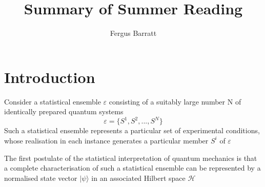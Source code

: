 \documentclass[reqno]{amsart}
\title{Summary of Summer Reading}
\author{Fergus Barratt}
\begin{document}
\maketitle
\section{Introduction\autocite{Breuer2002}}
Consider a statistical ensemble $\varepsilon$ consisting of a suitably large number N of identically prepared quantum systems
\begin{equation}
	\varepsilon = \{S^1, S^2, ..., S^N\}
\end{equation}
Such a statistical ensemble represents a particular set of experimental conditions, whose realisation in each instance generates a particular member $S^i$ of  $\varepsilon$

The first postulate of the statistical interpretation of quantum mechanics is that a complete characterisation of such a statistical ensemble can be represented by a normalised state vector $| \psi \rangle$ in an associated Hilbert space $\mathcal{H}$
\end{document}
